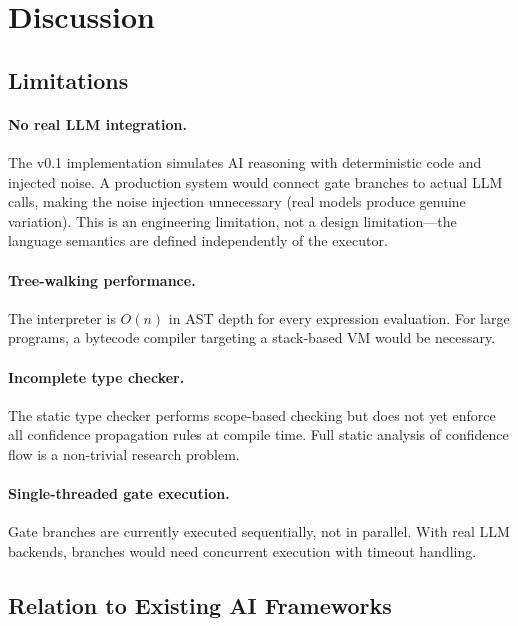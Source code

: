 \documentclass[11pt,a4paper]{article}
\begin{document}
\section{Discussion}
\label{sec:discussion}

\subsection{Limitations}

\paragraph{No real LLM integration.}
The v0.1 implementation simulates AI reasoning with deterministic code and
injected noise. A production system would connect gate branches to actual
LLM calls, making the noise injection unnecessary (real models produce genuine
variation). This is an engineering limitation, not a design limitation---the
language semantics are defined independently of the executor.

\paragraph{Tree-walking performance.}
The interpreter is $O(n)$ in AST depth for every expression evaluation.
For large programs, a bytecode compiler targeting a stack-based VM would be
necessary.

\paragraph{Incomplete type checker.}
The static type checker performs scope-based checking but does not yet enforce
all confidence propagation rules at compile time. Full static analysis of
confidence flow is a non-trivial research problem.

\paragraph{Single-threaded gate execution.}
Gate branches are currently executed sequentially, not in parallel. With real
LLM backends, branches would need concurrent execution with timeout handling.

\subsection{Relation to Existing AI Frameworks}
\end{document}

